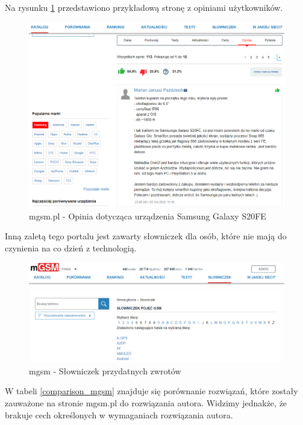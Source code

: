 Na rysunku \ref*{mgsm_4} przedstawiono przykładową stronę z opiniami użytkowników.
\begin{figure}[H]
    \centering
    \includegraphics[scale=0.45]{img/mgsm/mgsmComments.png}
    \caption{mgsm.pl - Opinia dotycząca urządzenia Samsung Galaxy S20FE}
    \label{mgsm_4}
\end{figure}
Inną zaletą tego portalu jest zawarty słowniczek dla osób, które nie mają do czynienia na co dzień z technologią. 
\begin{figure}[H]
    \centering
    \includegraphics[scale=0.47]{img/mgsm/dictonary.png}
    \caption{mgsm - Słowniczek przydatnych zwrotów }
    \label{mgsm_5}
\end{figure}
W tabeli \ref*{comparison_mgsm} znajduje się porównanie rozwiązań, które zostały zauważone na stronie mgsm.pl do rozwiązania autora. Widzimy jednakże, że brakuje cech określonych w wymaganiach rozwiązania autora.
